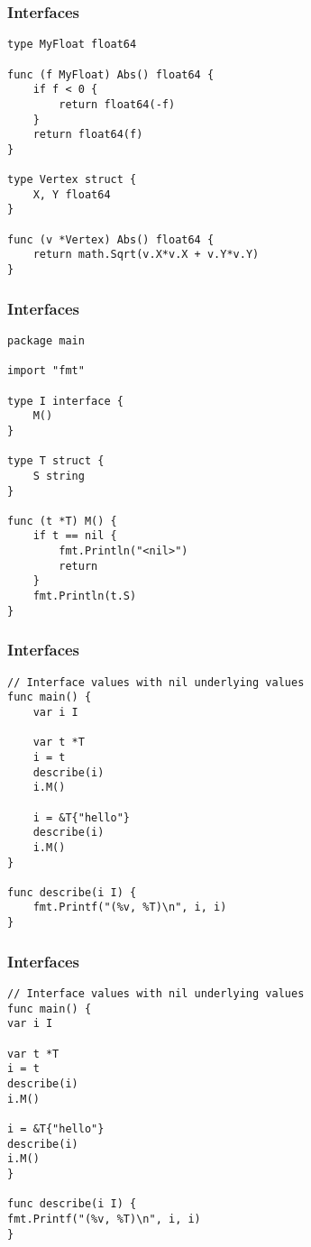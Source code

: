 \begin{frame}[fragile]
\frametitle{Interfaces}

\begin{lstlisting}
type MyFloat float64

func (f MyFloat) Abs() float64 {
    if f < 0 {
        return float64(-f)
    }
    return float64(f)
}

type Vertex struct {
    X, Y float64
}

func (v *Vertex) Abs() float64 {
    return math.Sqrt(v.X*v.X + v.Y*v.Y)
}
\end{lstlisting}
\end{frame}


\begin{frame}[fragile]
\frametitle{Interfaces}

\begin{lstlisting}
package main

import "fmt"

type I interface {
    M()
}

type T struct {
    S string
}

func (t *T) M() {
    if t == nil {
        fmt.Println("<nil>")
        return
    }
    fmt.Println(t.S)
}
\end{lstlisting}
\end{frame}


\begin{frame}[fragile]
\frametitle{Interfaces}

\begin{lstlisting}
// Interface values with nil underlying values
func main() {
    var i I

    var t *T
    i = t
    describe(i)
    i.M()

    i = &T{"hello"}
    describe(i)
    i.M()
}

func describe(i I) {
    fmt.Printf("(%v, %T)\n", i, i)
}
\end{lstlisting}
\end{frame}


\begin{frame}[fragile]
\frametitle{Interfaces}

\begin{lstlisting}
// Interface values with nil underlying values
func main() {
var i I

var t *T
i = t
describe(i)
i.M()

i = &T{"hello"}
describe(i)
i.M()
}

func describe(i I) {
fmt.Printf("(%v, %T)\n", i, i)
}
\end{lstlisting}
\end{frame}


